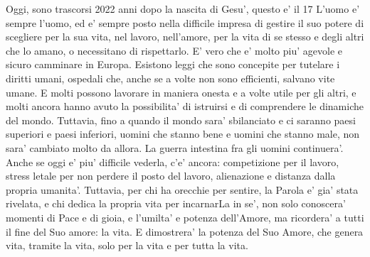 {  Oggi, sono trascorsi 2022 anni dopo la nascita di Gesu', questo e' il 17%
  L'uomo e' sempre l'uomo, ed e' sempre posto nella difficile impresa di gestire il suo potere di scegliere per la sua vita, nel lavoro, nell'amore, per la vita di se stesso e degli altri che lo amano, o necessitano di rispettarlo. 
E' vero che e' molto piu' agevole e sicuro camminare in Europa. Esistono leggi che sono concepite per tutelare i diritti umani, ospedali che, anche se a volte non sono efficienti, salvano vite umane. E molti possono lavorare in maniera onesta e a volte utile per gli altri, e molti ancora hanno avuto la possibilita' di istruirsi e di comprendere le dinamiche del mondo.
Tuttavia, fino a quando il mondo sara' sbilanciato e ci saranno paesi superiori e paesi inferiori, uomini che stanno bene e uomini che stanno male, non sara' cambiato molto da allora. La guerra intestina fra gli uomini continuera'. Anche se oggi e' piu' difficile vederla, c'e' ancora: competizione per il lavoro, stress letale per non perdere il posto del lavoro, alienazione e distanza dalla propria umanita'.
  Tuttavia, per chi ha orecchie per sentire, la Parola e' gia' stata rivelata, e chi dedica la propria vita per incarnarLa in se', non solo conoscera' momenti di Pace e di gioia, e l'umilta' e potenza dell'Amore, ma ricordera' a tutti il fine del Suo amore: la vita. E dimostrera' la potenza del Suo Amore, che genera vita, tramite la vita, solo per la vita e per tutta la vita.}



